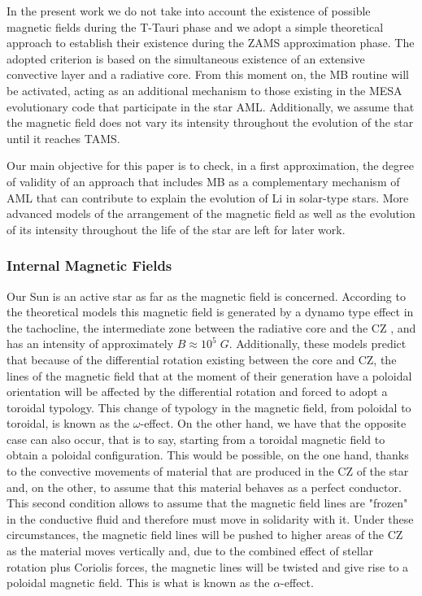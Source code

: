 \documentclass[fleqn,usenatbib]{mnras}
\begin{document}
In the present work we do not take into account the existence of possible magnetic fields during the T-Tauri phase and we adopt a simple theoretical approach to establish their existence during the ZAMS approximation phase. The adopted criterion is based on the simultaneous existence of an extensive convective layer and a radiative core. From this moment on, the MB routine will be activated, acting as an additional mechanism to those existing in the MESA evolutionary code that participate in the star AML. Additionally, we assume that the magnetic field does not vary its intensity throughout the evolution of the star until it reaches TAMS.\par

Our main objective for this paper is to check, in a first approximation, the degree of validity of an approach that includes MB as a complementary mechanism of AML that can contribute to explain the evolution of Li in solar-type stars. More advanced models of the arrangement of the magnetic field as well as the evolution of its intensity throughout the life of the star are left for later work.\par

\subsubsection{Internal Magnetic Fields}
Our Sun is an active star as far as the magnetic field is concerned. According to the theoretical models this magnetic field is generated by a dynamo type effect in the tachocline, the intermediate zone between the radiative core and the CZ \citep{Aschwanden2014}, and has an intensity of approximately $B\approx10^5\; G$. Additionally, these models predict that because of the differential rotation existing between the core and CZ, the lines of the magnetic field that at the moment of their generation have a poloidal orientation will be affected by the differential rotation and forced to adopt a toroidal typology. This change of typology in the magnetic field, from poloidal to toroidal, is known as the $\omega$-effect. On the other hand, we have that the opposite case can also occur, that is to say, starting from a toroidal magnetic field to obtain a poloidal configuration. This would be possible, on the one hand, thanks to the convective movements of material that are produced in the CZ of the star and, on the other, to assume that this material behaves as a perfect conductor. This second condition allows to assume that the magnetic field lines are "frozen" in the conductive fluid and therefore must move in solidarity with it. Under these circumstances, the magnetic field lines will be pushed to higher areas of the CZ as the material moves vertically and, due to the combined effect of stellar rotation plus Coriolis forces, the magnetic lines will be twisted and give rise to a poloidal magnetic field. This is what is known as the $\alpha$-effect.\par
\end{document}
